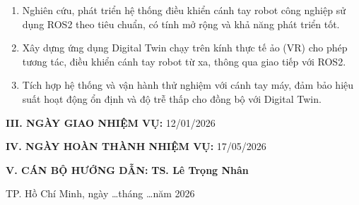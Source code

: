 \begin{enumerate}
\item Nghiên cứu, phát triển hệ thống điều khiển cánh tay robot công nghiệp sử dụng ROS2 theo tiêu chuẩn, có tính mở rộng và khả năng phát triển tốt.
\item Xây dựng ứng dụng Digital Twin chạy trên kính thực tế ảo (VR) cho phép tương tác, điều khiển cánh tay robot từ xa, thông qua giao tiếp với ROS2.
\item Tích hợp hệ thống và vận hành thử nghiệm với cánh tay máy, đảm bảo hiệu suất hoạt động ổn định và độ trễ thấp cho đồng bộ với Digital Twin.
\end{enumerate}


\noindent\textbf{III. NGÀY GIAO NHIỆM VỤ:} 12/01/2026

\noindent\textbf{IV. NGÀY HOÀN THÀNH NHIỆM VỤ:} 17/05/2026

\noindent\textbf{V. CÁN BỘ HƯỚNG DẪN:} \textbf{TS. Lê Trọng Nhân}

\vspace{0.2cm}

\begin{flushright}
    {\fontsize{13pt}{15pt}\selectfont TP. Hồ Chí Minh, ngày \ldots tháng \ldots năm 2026}
\end{flushright}

\vspace{0.1cm}

\noindent{}

\vfill


